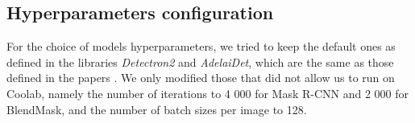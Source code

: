 \documentclass[10pt,twocolumn,letterpaper]{article}
\begin{document}
\subsection{Hyperparameters configuration}
For the choice of models hyperparameters, we tried to keep the default ones as defined in the libraries \textit{Detectron2} and \textit{AdelaiDet}, which are the same as those defined in the papers \cite{Authors1_maskrcnn, Authors2_BlendMask}. We only modified those that did not allow us to run on Coolab, namely the number of iterations to 4 000 for Mask R-CNN and 2 000 for BlendMask, and the number of batch sizes per image to 128.
\end{document}
